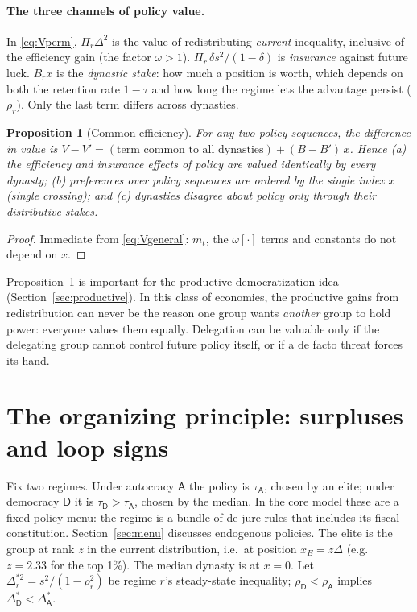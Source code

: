 \documentclass[11pt]{article}
\newtheorem{proposition}{Proposition}
\theoremstyle{remark}
\newcommand{\A}{\mathsf{A}}
\newcommand{\D}{\mathsf{D}}
\begin{document}
\paragraph{The three channels of policy value.}  In \eqref{eq:Vperm}, $\Pi_r\Delta^2$ is the value of redistributing \emph{current} inequality, inclusive of the efficiency gain (the factor $\omega>1$).  $\Pi_r\,\delta s^2/(1-\delta)$ is \emph{insurance} against future luck.  $B_r x$ is the \emph{dynastic stake}: how much a position is worth, which depends on both the retention rate $1-\tau$ and how long the regime lets the advantage persist ($\rho_r$).  Only the last term differs across dynasties.

\begin{proposition}[Common efficiency]\label{prop:common}
For any two policy sequences, the difference in value is $V-V'=(\text{term common to all dynasties})+(B-B')\,x$.  Hence (a) the efficiency and insurance effects of policy are valued identically by every dynasty; (b) preferences over policy sequences are ordered by the single index $x$ (single crossing); and (c) dynasties disagree about policy \emph{only} through their distributive stakes.
\end{proposition}
\begin{proof}
Immediate from \eqref{eq:Vgeneral}: $m_t$, the $\omega[\cdot]$ terms and constants do not depend on $x$.
\end{proof}

Proposition~\ref{prop:common} is important for the productive-democratization idea (Section~\ref{sec:productive}).  In this class of economies, the productive gains from redistribution can never be the reason one group wants \emph{another} group to hold power: everyone values them equally.  Delegation can be valuable only if the delegating group cannot control future policy itself, or if a de facto threat forces its hand.

\section{The organizing principle: surpluses and loop signs}\label{sec:loops}

Fix two regimes.  Under autocracy $\A$ the policy is $\tau_\A$, chosen by an elite; under democracy $\D$ it is $\tau_\D>\tau_\A$, chosen by the median.  In the core model these are a fixed policy menu: the regime is a bundle of de jure rules that includes its fiscal constitution.  Section~\ref{sec:menu} discusses endogenous policies.  The elite is the group at rank $z$ in the current distribution, i.e.\ at position $x_E=z\Delta$ (e.g.\ $z=2.33$ for the top 1\%).  The median dynasty is at $x=0$.  Let $\Delta^{*2}_r=s^2/(1-\rho_r^2)$ be regime $r$'s steady-state inequality; $\rho_\D<\rho_\A$ implies $\Delta^*_\D<\Delta^*_\A$.
\end{document}
